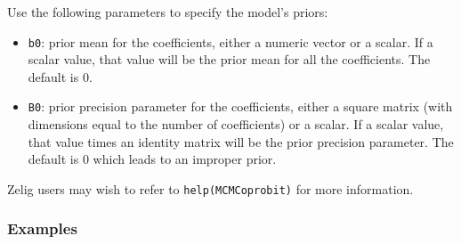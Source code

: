 Use the following parameters to specify the model's priors:  
\begin{itemize}
\item \texttt{b0}: prior mean for the coefficients, either a numeric 
vector or a scalar. If a scalar value, that value will be the prior
mean for all the coefficients. The default is 0.

\item \texttt{B0}: prior precision parameter for the coefficients,
either a square matrix (with dimensions equal to the number of
coefficients) or a scalar. If a scalar value, that value times an
identity matrix will be the prior precision parameter. The default is
0 which leads to an improper prior.
\end{itemize}

\noindent Zelig users may wish to refer to \texttt{help(MCMCoprobit)} 
for more information.



\subsubsection{Examples}

